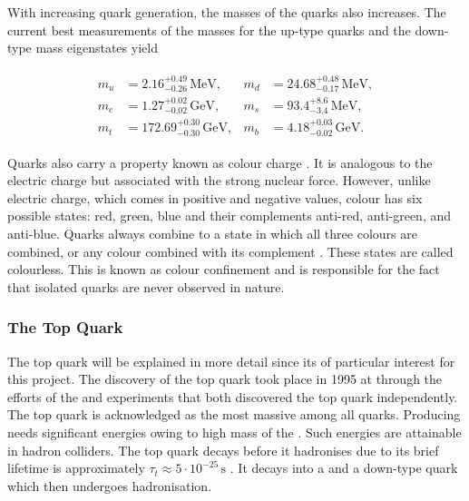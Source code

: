 \documentclass[bachelor,ngerman,english]{GAUBM}
\begin{document}
With increasing quark generation, the masses of the quarks also increases. The current best measurements of the masses for the up-type quarks and the down-type mass eigenstates \cite{pdg} yield 

\begin{gather}
    \begin{aligned}
        m_u &= 2.16^{+0.49}_{-0.26}\,\text{MeV},    & m_d &= 24.68^{+0.48}_{-0.17}\,\text{MeV},\\
        m_c &= 1.27^{+0.02}_{-0.02}\,\text{GeV},    & m_s &= 93.4^{+8.6}_{-3.4}\,\text{MeV},\\
        m_t &= 172.69^{+0.30}_{-0.30}\,\text{GeV},  & m_b &= 4.18^{+0.03}_{-0.02}\,\text{GeV}.
        \label{eq:mass_quarks}
    \end{aligned}
\end{gather}

Quarks also carry a property known as colour charge \cite{theory:qcd_01,theory:qcd_02}. It is analogous to the electric charge but associated with the strong nuclear force. However, unlike electric charge, which comes in positive and negative values, colour has six possible states: red, green, blue and their complements anti-red, anti-green, and anti-blue. Quarks always combine to a state in which all three colours are combined, or any colour combined with its complement \cite{theory:qcd_02}. These states are called colourless. This is known as colour confinement and is responsible for the fact that isolated quarks are never observed in nature.

\subsubsection*{The Top Quark}
\label{sec:theory:top}
The top quark will be explained in more detail since its of particular interest for this project. The discovery of the top quark took place in 1995 at \fermilab through the efforts of the \dzero \cite{theory:top_discovery_01} and \cdf \cite{theory:top_discovery_02} experiments that both discovered the top quark independently. The top quark is acknowledged as the most massive among all quarks. Producing \tquarks needs significant energies owing to  high mass of the \tquark. Such energies are attainable in hadron colliders. The top quark decays before it hadronises due to its brief lifetime is approximately $\tau_t\approx5\cdot10^{-25}\,\text{s}$ \cite{pdg}. It decays into a \wboson and a down-type quark which then undergoes hadronisation. 
\end{document}
